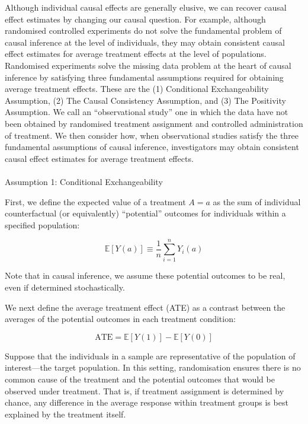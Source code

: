 \documentclass[
  singlecolumn]{article}
\makeatletter
\let\oldparagraph\paragraph
\renewcommand{\paragraph}{
    \@ifstar
      \xxxParagraphStar
      \xxxParagraphNoStar
  }
\newcommand{\xxxParagraphStar}[1]{\oldparagraph*{#1}\mbox{}}
\newcommand{\xxxParagraphNoStar}[1]{\oldparagraph{#1}\mbox{}}
\makeatother
\begin{document}
Although individual causal effects are generally elusive, we can recover
causal effect estimates by changing our causal question. For example,
although randomised controlled experiments do not solve the fundamental
problem of causal inference at the level of individuals, they may obtain
consistent causal effect estimates for average treatment effects at the
level of populations. Randomised experiments solve the missing data
problem at the heart of causal inference by satisfying three fundamental
assumptions required for obtaining average treatment effects. These are
the (1) Conditional Exchangeability Assumption, (2) The Causal
Consistency Assumption, and (3) The Positivity Assumption. We call an
``observational study'' one in which the data have not been obtained by
randomised treatment assignment and controlled administration of
treatment. We then consider how, when observational studies satisfy the
three fundamental assumptions of causal inference, investigators may
obtain consistent causal effect estimates for average treatment effects.

\paragraph{Assumption 1: Conditional
Exchangeability}\label{assumption-1-conditional-exchangeability}

First, we define the expected value of a treatment \(A=a\) as the sum of
individual counterfactual (or equivalently) ``potential'' outcomes for
individuals within a specified population:

\[
\mathbb{E}[Y(a)] \equiv \frac{1}{n} \sum_{i=1}^n Y_i(a)
\]

Note that in causal inference, we assume these potential outcomes to be
real, even if determined stochastically.

We next define the average treatment effect (ATE) as a contrast between
the averages of the potential outcomes in each treatment condition:

\[
\text{ATE} = \mathbb{E}[Y(1)] - \mathbb{E}[Y(0)]
\]

Suppose that the individuals in a sample are representative of the
population of interest---the target population. In this setting,
randomisation ensures there is no common cause of the treatment and the
potential outcomes that would be observed under treatment. That is, if
treatment assignment is determined by chance, any difference in the
average response within treatment groups is best explained by the
treatment itself.
\end{document}
